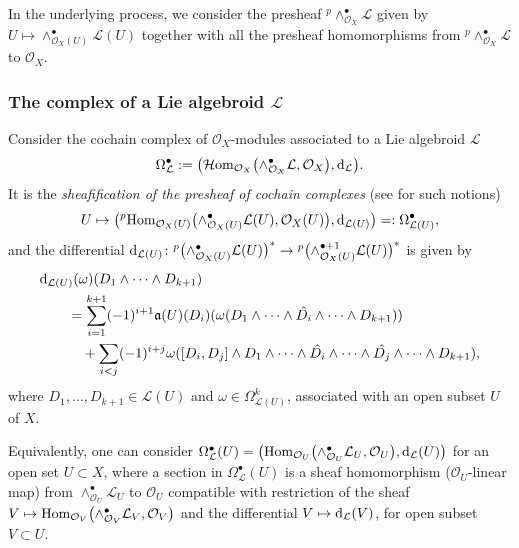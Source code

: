 \documentclass[pdftex]{sigma}
\numberwithin{equation}{section}
\theoremstyle{definition}
\begin{document}
In the underlying process, we consider the presheaf $^p \wedge^{\bullet}_{\mathcal{O}_X} \mathcal{L}$ given by $U \mapsto \wedge^{\bullet}_{\mathcal{O}_X(U)} \mathcal{L}(U)$ together with all the presheaf homomorphisms from $^p \wedge^{\bullet}_{\mathcal{O}_X} \mathcal{L}$ to $\mathcal{O}_X$.

\subsubsection[The complex of a Lie algebroid L]{The complex of a Lie algebroid $\boldsymbol{\mathcal{L}}$}

Consider the cochain complex of $\mathcal{O}_X$-modules associated to a Lie algebroid $\mathcal{L}$
\begin{align} \label{Chevalley-Eilenberg-de Rham complex}
	\Omega^{\bullet}_{\mathcal{L}}:= \bigl(\mathcal{H}{\rm om}_{\mathcal{O}_X}\bigl(\wedge^\bullet_{\mathcal{O}_X}\mathcal{L}, \mathcal{O}_X\bigr), {\rm d}_{\mathcal{L}}\bigr).
\end{align}
It is the \emph{sheafification of the presheaf of cochain complexes} (see \cite{CW1} for such notions)
\[
U\mapsto \bigl({}^p {\rm Hom}_{\mathcal{O}_X(U)}\bigl(\wedge^\bullet_{\mathcal{O}_X(U)}\mathcal{L}(U), \mathcal{O}_X(U)\bigr), {\rm d}_{\mathcal{L}(U)}\bigr)=:\Omega_{\mathcal{L}(U)}^\bullet,
\]
and the differential ${\rm d}_{\mathcal{L}(U)}\colon {}^p \bigl(\wedge^\bullet_{\mathcal{O}_X(U)}\mathcal{L}(U)\bigr)^* \rightarrow {}^p \bigl(\wedge^{\bullet +1}_{\mathcal{O}_X(U)}\mathcal{L}(U)\bigr)^*$ is given by
\begin{align}
&{\rm d}_{\mathcal{L}(U)}(\omega)(D_1\wedge \cdots \wedge D_{k+1}) \nonumber\\
& \qquad = \sum^{k+1}_{i=1}(-1)^{i+1}\mathfrak{a}(U)(D_i)(\omega(D_1\wedge \cdots \wedge \hat{D_i} \wedge \cdots \wedge D_{k+1}))\nonumber\\
&\qquad\quad + \sum_{i< j}(-1)^{i+j}\omega([D_i, D_j]\wedge D_1\wedge \cdots \wedge \hat{D_i}\wedge \cdots \wedge \hat{D_j}\wedge \cdots \wedge D_{k+1}),\label{C-E-D differential}
\end{align}
where $D_1, \dots, D_{k+1} \in \mathcal{L}(U)$ and $ \omega \in \Omega^k_{\mathcal{L}(U)}$, associated with an open subset $U$ of $X$.

Equivalently, one can consider $\Omega^{\bullet}_{\mathcal{L}}(U)= \bigl({\rm Hom}_{\mathcal{O}_U}\bigl(\wedge^\bullet_{\mathcal{O}_U}\mathcal{L}_U, \mathcal{O}_U\bigr), {\rm d}_{\mathcal{L}}(U)\bigr)$ for an open set ${U \subset X}$, where a section in $\Omega^{\bullet}_{\mathcal{L}}(U)$ is a sheaf homomorphism ($\mathcal{O}_U$-linear map) from $\wedge^\bullet_{\mathcal{O}_U}\mathcal{L}_U$ to $\mathcal{O}_U$ compatible with restriction of the sheaf $V \mapsto {\rm Hom}_{\mathcal{O}_V}\bigl(\wedge^\bullet_{\mathcal{O}_V}\mathcal{L}_V, \mathcal{O}_V\bigr)$ and the differential $V \mapsto {\rm d}_{\mathcal{L}}(V)$, for open subset $V \subset U$.
\end{document}
